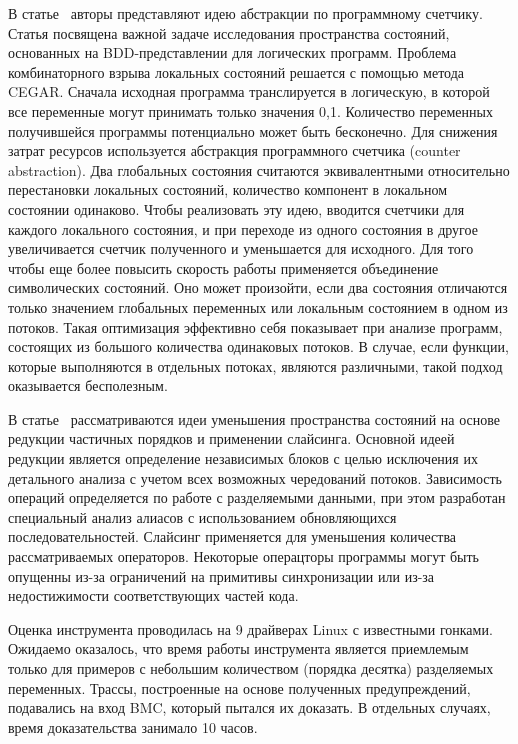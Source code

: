 В статье~\cite{Basler:2009} авторы представляют идею абстракции по программному счетчику.
Статья посвящена важной задаче исследования пространства состояний, основанных на BDD-представлении для логических программ.
Проблема комбинаторного взрыва локальных состояний решается с помощью метода CEGAR. 
Сначала исходная программа транслируется в логическую, в которой все переменные могут принимать только значения {0,1}.
Количество переменных получившейся программы потенциально может быть бесконечно. 
Для снижения затрат ресурсов используется абстракция программного счетчика (counter abstraction).
Два глобальных состояния считаются эквивалентными относительно перестановки локальных состояний, количество компонент в локальном состоянии одинаково.
Чтобы реализовать эту идею, вводится счетчики для каждого локального состояния, и при переходе из одного состояния в другое увеличивается счетчик полученного и уменьшается для исходного. 
Для того чтобы еще более повысить скорость работы применяется объединение символических состояний.
Оно может произойти, если два состояния отличаются только значением глобальных переменных или локальным состоянием в одном из потоков. 
Такая оптимизация эффективно себя показывает при анализе программ, состоящих из большого количества одинаковых потоков.
В случае, если функции, которые выполняются в отдельных потоках, являются различными, такой подход оказывается бесполезным.


В статье~\cite{Kahlon:2009:SRTI} рассматриваются идеи уменьшения пространства состояний на основе редукции частичных порядков и применении слайсинга.
Основной идеей редукции является определение независимых блоков с целью исключения их детального анализа с учетом всех возможных чередований потоков.
Зависимость операций определяется по работе с разделяемыми данными, при этом разработан специальный анализ алиасов с использованием обновляющихся последовательностей.
Слайсинг применяется для уменьшения количества рассматриваемых операторов. Некоторые операцторы программы могут быть опущенны из-за ограничений на примитивы синхронизации или из-за недостижимости соответствующих частей кода.

Оценка инструмента проводилась на 9 драйверах Linux с известными гонками. Ожидаемо оказалось, что время работы инструмента является приемлемым только для примеров с небольшим количеством (порядка десятка) разделяемых переменных.
Трассы, построенные на основе полученных предупреждений, подавались на вход BMC, который пытался их доказать. В отдельных случаях, время доказательства занимало 10 часов. 

